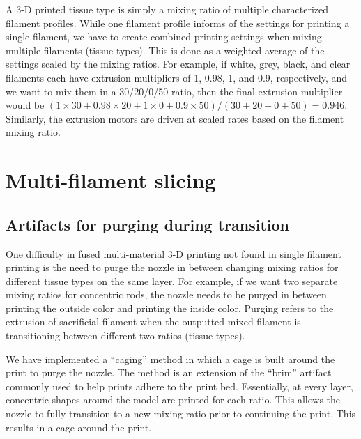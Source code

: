 A 3-D printed tissue type is simply a mixing ratio of multiple characterized filament profiles. While one filament profile informs of the settings for printing a single filament, we have to create combined printing settings when mixing multiple filaments (tissue types). This is done as a weighted average of the settings scaled by the mixing ratios. For example, if white, grey, black, and clear filaments each have extrusion multipliers of 1, 0.98, 1, and 0.9, respectively, and we want to mix them in a 30/20/0/50 ratio, then the final extrusion multiplier would be
$(1\times30 + 0.98\times20 + 1\times0 + 0.9\times50) / (30+20+0+50) = 0.946$. Similarly, the extrusion motors are driven at scaled rates based on the filament mixing ratio.



\section{Multi-filament slicing}
\subsection{Artifacts for purging during transition}
One difficulty in fused multi-material 3-D printing not found in single filament printing is the need to purge the nozzle in between changing mixing ratios for different tissue types on the same layer. For example, if we want two separate mixing ratios for concentric rods, the nozzle needs to be purged in between printing the outside color and printing the inside color. Purging refers to the extrusion of sacrificial filament when the outputted mixed filament is transitioning between different two ratios (tissue types).

We have implemented a ``caging'' method in which a cage is built around the print to purge the nozzle. The method is an extension of the ``brim'' artifact commonly used to help prints adhere to the print bed. Essentially, at every layer, concentric shapes around the model are printed for each ratio. This allows the nozzle to fully transition to a new mixing ratio prior to continuing the print. This results in a cage around the print. 

